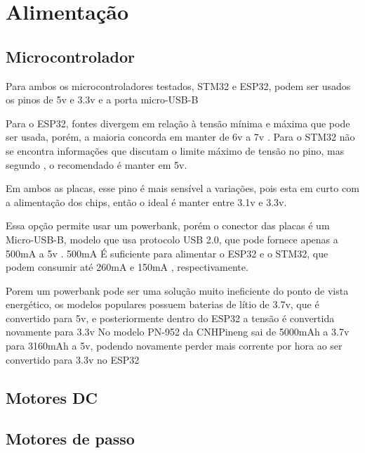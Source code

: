 
\section{Alimentação}


\subsection{Microcontrolador}

Para ambos os microcontroladores testados, STM32 e ESP32,
podem ser usados os pinos de 5v  e 3.3v e a porta micro-USB-B


Para o ESP32, fontes divergem em relação à tensão mínima e máxima 
que pode ser usada, porém, a maioria concorda em manter de
6v a 7v \cite{esp32_reference_power_supply_1,esp32_reference_power_supply_2, esp32_reference_2}.
Para o STM32 não se encontra informações que discutam o limite máximo de tensão no pino, mas segundo \cite{stm_doc},
o recomendado é manter em 5v.

Em ambos as placas, esse pino é mais sensível a variações, pois esta em curto com a alimentação
dos chips, então o ideal é manter entre 3.1v e 3.3v.

Essa opção permite usar um powerbank, porém o conector das placas é um Micro-USB-B,
modelo que usa protocolo USB 2.0, que pode fornece apenas a 500mA a 5v \cite{micro_usb_b}.
500mA É suficiente para alimentar o ESP32 e o STM32, que podem consumir 
até 260mA \cite{esp_max_current} e 150mA \cite{stm32_datasheet}, respectivamente.

Porem um powerbank pode ser uma solução muito ineficiente do ponto de vista energético,
os modelos populares possuem baterias de lítio de 3.7v, que é convertido para 5v,
e posteriormente dentro do ESP32 a tensão é convertida novamente para 3.3v
No modelo PN-952 da CNHPineng sai de 5000mAh a 3.7v  para 3160mAh a 5v,
podendo novamente perder mais corrente por hora ao ser convertido para 3.3v no ESP32


\subsection{Motores DC}
\lipsum[1]

\subsection{Motores de passo}

